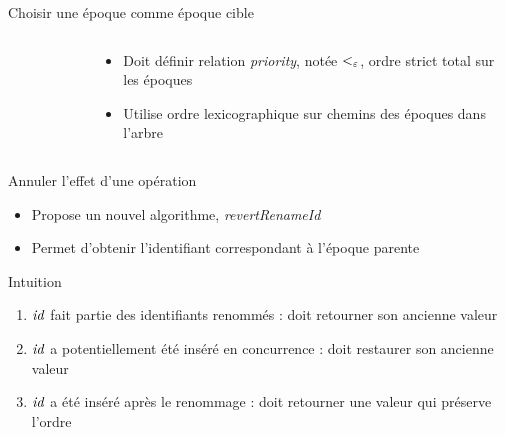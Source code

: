 \begin{frame}{Choisir une époque comme époque cible}
\begin{columns}
\begin{column}{0.3 \textwidth}
\begin{figure}
{
        }
      \end{figure}
    \end{column}
    \begin{column}{0.7 \textwidth}
      \begin{itemize}
        \item Doit définir relation \emph{priority}, notée $<_{\varepsilon}$, ordre strict total sur les époques
        \item Utilise ordre lexicographique sur chemins des époques dans l'arbre
      \end{itemize}
    \end{column}
  \end{columns}
\end{frame}

\begin{frame}{Annuler l'effet d'une opération \ren}
  \begin{itemize}
    \item Propose un nouvel algorithme, \emph{revertRenameId}
    \item Permet d'obtenir l'identifiant correspondant à l'époque parente
  \end{itemize}
  \begin{block}{Intuition}
    \begin{enumerate}
      \item $\mathit{id}$ fait partie des identifiants renommés : doit retourner son ancienne valeur
      \item $\mathit{id}$ a potentiellement été inséré en concurrence : doit restaurer son ancienne valeur
      \item $\mathit{id}$ a été inséré après le renommage : doit retourner une valeur qui préserve l'ordre
    \end{enumerate}
  \end{block}
\end{frame}


